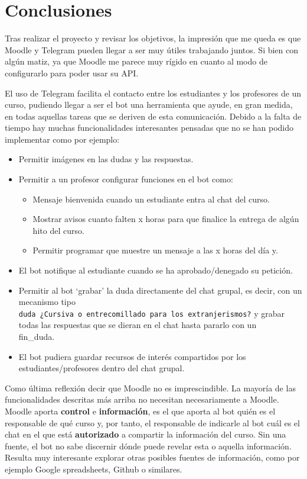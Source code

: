 \section{Conclusiones}

Tras realizar el proyecto y revisar los objetivos, la impresión que me queda es que Moodle y Telegram pueden llegar a ser muy útiles trabajando juntos. Si bien con algún matiz, ya que Moodle me parece muy rígido en cuanto al modo de configurarlo para poder usar su API.
\par
El uso de Telegram facilita el contacto entre los estudiantes y los profesores de un curso, pudiendo llegar a ser el bot una herramienta que ayude, en gran medida, en todas aquellas tareas que se deriven de esta comunicación. Debido a la falta de tiempo hay muchas funcionalidades interesantes pensadas que no se han podido implementar como por ejemplo:
\begin{itemize}
\item Permitir imágenes en las dudas y las respuestas. 
\item Permitir a un profesor configurar funciones en el bot como:
\begin{itemize}
\item Mensaje bienvenida cuando un estudiante entra al chat del curso. 
\item Mostrar avisos cuanto falten x horas para que finalice la entrega de algún hito del curso.
\item Permitir programar que muestre un mensaje a las x horas del día y.
\end{itemize}
\item El bot notifique al estudiante cuando se ha aprobado/denegado su petición.
\item Permitir al bot \enquote*{grabar} la duda directamente del chat grupal, es decir, con un mecanismo tipo \texttt{\\duda ¿Cursiva o entrecomillado para los extranjerismos?} y grabar todas las respuestas que se dieran en el chat hasta pararlo con un \\fin\_duda.
\item El bot pudiera guardar recursos de interés compartidos por los estudiantes/profesores dentro del chat grupal.
\end{itemize}


Como última reflexión decir que Moodle no es imprescindible. La mayoría de las funcionalidades descritas más arriba no necesitan necesariamente a Moodle. 
Moodle aporta \textbf{control} e \textbf{información}, es el que aporta al bot quién es el responsable de qué curso y, por tanto, el responsable de indicarle al bot cuál es el chat en el que está \textbf{autorizado} a compartir la información del curso. Sin una fuente, el bot no sabe discernir dónde puede revelar esta o aquella información. Resulta muy interesante explorar otras posibles fuentes de información, como por ejemplo Google spreadsheets, Github o similares. 